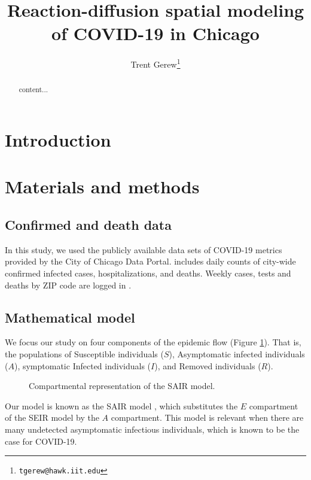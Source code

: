 \documentclass[11pt]{article}
\title{Reaction-diffusion spatial modeling of COVID-19 in Chicago}
\author{Trent Gerew\thanks{\texttt{tgerew@hawk.iit.edu}}}
\institute{Department of Applied Mathematics, Illinois Institute of Technology, Chicago, Illinois}
\begin{document}
\maketitle

\begin{abstract}
	content...
\end{abstract}

\section{Introduction}

\section{Materials and methods}
	\subsection{Confirmed and death data}
		In this study, we used the publicly available data sets of COVID-19 metrics provided by the City of Chicago Data Portal.
		\cite{Chicago-cases} includes daily counts of city-wide confirmed infected cases, hospitalizations, and deaths.
		Weekly cases, tests and deaths by ZIP code are logged in \cite{Chicago-zips}.
	
	\subsection{Mathematical model}
		We focus our study on four components of the epidemic flow (Figure \ref{fig:model}).
		That is, the populations of Susceptible individuals ($S$), Asymptomatic infected individuals ($A$), symptomatic Infected individuals ($I$), and Removed individuals ($R$).
		\begin{figure}[h]
			\centering
			\caption{Compartmental representation of the SAIR model.}
			\label{fig:model}
		\end{figure}
		Our model is known as the SAIR model \cite{s+t+spain}, which substitutes the $E$ compartment of the SEIR model by the $A$ compartment.
		This model is relevant when there are many undetected asymptomatic infectious individuals, which is known to be the case for COVID-19.
		
\end{document}
